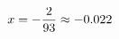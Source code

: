 \documentclass[preview]{standalone}
\begin{document}
\begin{align*}
\special{dvisvgm:raw <g id='unique000'>}x = - \frac{2}{93} \approx -0.022\special{dvisvgm:raw </g>}
\end{align*}
\end{document}
